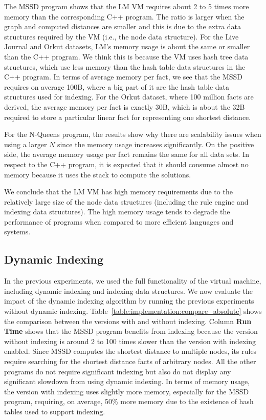 The MSSD program shows that the LM VM requires about 2 to 5 times more memory
than the corresponding C++ program. The ratio is larger when the graph and
computed distances are smaller and this is due to the extra data structures
required by the VM (i.e., the node data structure). For the Live Journal and
Orkut datasets, LM's memory usage is about the same or smaller than the C++
program. We think this is because the VM uses hash tree data structures, which
use less memory than the hash table data structures in the C++ program. In terms
of average memory per fact, we see that the MSSD requires on average 100B, where
a big part of it are the hash table data structures used for indexing. For the
Orkut dataset, where 100 million facts are derived, the average memory per fact
is exactly 30B, which is about the 32B required to store a particular linear
fact for representing one shortest distance.

For the N-Queens program, the results show why there are scalability
issues when using a larger $N$ since the memory usage increases significantly.
On the positive side, the average memory usage per fact remains the same for all
data sets. In respect to the C++ program, it is expected that it should consume
almost no memory because it uses the stack to compute the solutions.

We conclude that the LM VM has high memory requirements due to the relatively
large size of the node data structures (including the rule engine and indexing
data structures). The high memory usage tends to degrade the performance of
programs when compared to more efficient languages and systems.

\subsection{Dynamic Indexing}

In the previous experiments, we used the full functionality of the virtual
machine, including dynamic indexing and indexing data structures. We now
evaluate the impact of the dynamic indexing algorithm by running the previous
experiments without dynamic indexing.
Table~\ref{table:implementation:compare_absolute} shows the comparison between
the versions with and without indexing.  Column \textbf{Run Time} shows that the
MSSD program benefits from indexing because the version without indexing is
around 2 to 100 times slower than the version with indexing enabled. Since MSSD
computes the shortest distance to multiple nodes, its rules require searching
for the shortest distance facts of arbitrary nodes. All the other programs do
not require significant indexing but also do not display any significant
slowdown from using dynamic indexing. In terms of memory usage, the version with
indexing uses slightly more memory, especially for the MSSD program, requiring,
on average, 50\% more memory due to the existence of hash tables used to support
indexing.

